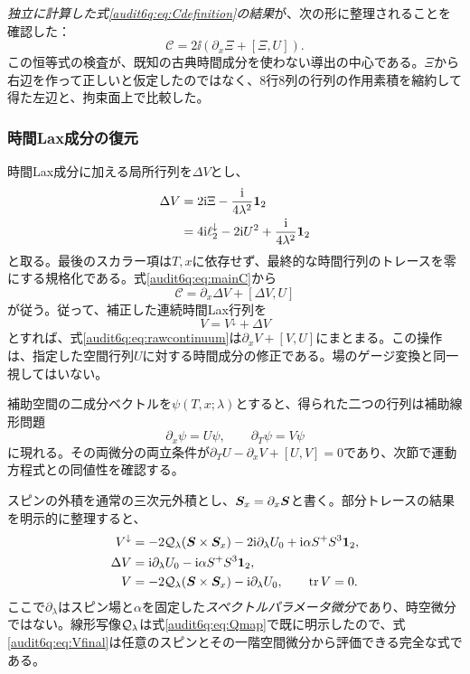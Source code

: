\emph{独立に計算した式\eqref{audit6q:eq:Cdefinition}の結果}が、次の形に整理されることを確認した：
\begin{equation}
\mathcal C=2\ii\left(\partial_x\Xi+[\Xi,U]\right).
\label{audit6q:eq:mainC}
\end{equation}
この恒等式の検査が、既知の古典時間成分を使わない導出の中心である。$\Xi$から右辺を作って正しいと仮定したのではなく、8行8列の行列の作用素積を縮約して得た左辺と、拘束面上で比較した。

\subsubsection{時間Lax成分の復元}
時間Lax成分に加える局所行列を$\Delta V$とし、
\begin{align}
\Delta V&=2\mathrm i\Xi-\frac{\mathrm i}{4\lambda^2}\mathbf 1_{2}
\label{audit6q:eq:DeltaXi}\\
&=4\mathrm i\ell_2^\downarrow-2\mathrm i U^2+\frac{\mathrm i}{4\lambda^2}\mathbf 1_{2}
\label{audit6q:eq:Delta}
\end{align}
と取る。最後のスカラー項は$T,x$に依存せず、最終的な時間行列のトレースを零にする規格化である。式\eqref{audit6q:eq:mainC}から
\begin{equation}
\mathcal C=\partial_x\Delta V+[\Delta V,U]
\label{audit6q:eq:absorb}
\end{equation}
が従う。従って、補正した連続時間Lax行列を
\begin{equation}
V=V^\downarrow+\Delta V
\label{audit6q:eq:Vcorrected}
\end{equation}
とすれば、式\eqref{audit6q:eq:rawcontinuum}は$\partial_xV+[V,U]$にまとまる。この操作は、指定した空間行列$U$に対する時間成分の修正である。場のゲージ変換と同一視してはいない。

補助空間の二成分ベクトルを$\psi(T,x;\lambda)$とすると、得られた二つの行列は補助線形問題
\begin{equation}
\partial_x\psi=U\psi,\qquad \partial_T\psi=V\psi
\label{audit6q:eq:linearproblem}
\end{equation}
に現れる。その両微分の両立条件が$\partial_TU-\partial_xV+[U,V]=0$であり、次節で運動方程式との同値性を確認する。

スピンの外積を通常の三次元外積とし、$\boldsymbol S_x=\partial_x\boldsymbol S$と書く。部分トレースの結果を明示的に整理すると、
\begin{align}
V^\downarrow&=-2\mathcal Q_{\lambda}(\boldsymbol S\times\boldsymbol S_x)
-2\mathrm i\partial_\lambda U_0+\mathrm i\alpha S^+S^3\mathbf 1_{2},
\label{audit6q:eq:Vdownexplicit}\\
\Delta V&=\mathrm i\partial_\lambda U_0-\mathrm i\alpha S^+S^3\mathbf 1_{2},
\label{audit6q:eq:Deltaexplicit}\\
V&=-2\mathcal Q_{\lambda}(\boldsymbol S\times\boldsymbol S_x)-\mathrm i\partial_\lambda U_0,
\qquad \operatorname{tr} V=0.
\label{audit6q:eq:Vfinal}
\end{align}
ここで$\partial_\lambda$はスピン場と$\alpha$を固定した\emph{スペクトルパラメータ微分}であり、時空微分ではない。線形写像$\mathcal Q_{\lambda}$は式\eqref{audit6q:eq:Qmap}で既に明示したので、式\eqref{audit6q:eq:Vfinal}は任意のスピンとその一階空間微分から評価できる完全な式である。

